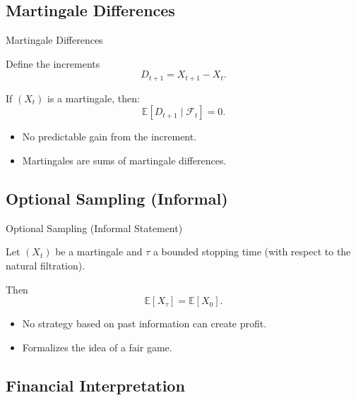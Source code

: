 \documentclass[aspectratio=169]{beamer}
\begin{document}
\subsection{Martingale Differences}

\begin{frame}{Martingale Differences}

Define the increments
\[
D_{t+1}=X_{t+1}-X_t.
\]
\pause
\medskip

If \((X_t)\) is a martingale, then:
\[
\mathbb{E}[D_{t+1}\mid\mathcal{F}_t]=0.
\]
\pause
\medskip

\begin{itemize}
  \item No predictable gain from the increment.\pause
  \item Martingales are sums of martingale differences.
\end{itemize}

\end{frame}

\subsection{Optional Sampling (Informal)}

\begin{frame}{Optional Sampling (Informal Statement)}

Let \((X_t)\) be a martingale and \(\tau\) a bounded stopping time
(with respect to the natural filtration).\pause

\medskip

Then
\[
\mathbb{E}[X_\tau]=\mathbb{E}[X_0].
\]\pause

\medskip

\begin{itemize}
  \item No strategy based on past information can create profit.\pause
  \item Formalizes the idea of a fair game.
\end{itemize}

\end{frame}

\subsection{Financial Interpretation}
\end{document}
